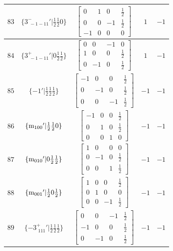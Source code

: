 \documentclass[fleqn,8pt]{jsarticle}
\begin{document}
\begin{longtable}{ccccc}
$ 83 $ & $ \{3^{-}_{\,\,-1-11}{}'|\frac{1}{2} \frac{1}{2} 0\} $ & $ \begin{bmatrix} 0 & 1 & 0 & \frac{1}{2} \\ 0 & 0 & -1 & \frac{1}{2} \\ -1 & 0 & 0 & 0 \end{bmatrix} $ & $ 1 $ & $ -1 $ \\ \hline
$ 84 $ & $ \{3^{+}_{\,\,-1-11}{}'|0 \frac{1}{2} \frac{1}{2}\} $ & $ \begin{bmatrix} 0 & 0 & -1 & 0 \\ 1 & 0 & 0 & \frac{1}{2} \\ 0 & -1 & 0 & \frac{1}{2} \end{bmatrix} $ & $ 1 $ & $ -1 $ \\ \hline
$ 85 $ & $ \{-1{}'|\frac{1}{2} \frac{1}{2} \frac{1}{2}\} $ & $ \begin{bmatrix} -1 & 0 & 0 & \frac{1}{2} \\ 0 & -1 & 0 & \frac{1}{2} \\ 0 & 0 & -1 & \frac{1}{2} \end{bmatrix} $ & $ -1 $ & $ -1 $ \\ \hline
$ 86 $ & $ \{{\rm m}_{100}{}'|\frac{1}{2} \frac{1}{2} 0\} $ & $ \begin{bmatrix} -1 & 0 & 0 & \frac{1}{2} \\ 0 & 1 & 0 & \frac{1}{2} \\ 0 & 0 & 1 & 0 \end{bmatrix} $ & $ -1 $ & $ -1 $ \\ \hline
$ 87 $ & $ \{{\rm m}_{010}{}'|0 \frac{1}{2} \frac{1}{2}\} $ & $ \begin{bmatrix} 1 & 0 & 0 & 0 \\ 0 & -1 & 0 & \frac{1}{2} \\ 0 & 0 & 1 & \frac{1}{2} \end{bmatrix} $ & $ -1 $ & $ -1 $ \\ \hline
$ 88 $ & $ \{{\rm m}_{001}{}'|\frac{1}{2} 0 \frac{1}{2}\} $ & $ \begin{bmatrix} 1 & 0 & 0 & \frac{1}{2} \\ 0 & 1 & 0 & 0 \\ 0 & 0 & -1 & \frac{1}{2} \end{bmatrix} $ & $ -1 $ & $ -1 $ \\ \hline
$ 89 $ & $ \{-3^{+}_{\,\,111}{}'|\frac{1}{2} \frac{1}{2} \frac{1}{2}\} $ & $ \begin{bmatrix} 0 & 0 & -1 & \frac{1}{2} \\ -1 & 0 & 0 & \frac{1}{2} \\ 0 & -1 & 0 & \frac{1}{2} \end{bmatrix} $ & $ -1 $ & $ -1 $ \\ \hline

\end{longtable}
\end{document}
